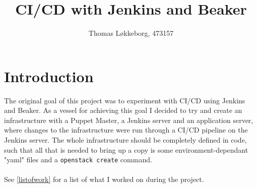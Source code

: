 

\title{CI/CD with Jenkins and Beaker}
\author{Thomas Løkkeborg, 473157}



\maketitle


\thispagestyle{empty}

\clearpage
{}
\setcounter{page}{1}
\tableofcontents

\clearpage
{}

\section{Introduction}

The original goal of this project was to experiment with CI/CD using Jenkins and Beaker. As a vessel for achieving this goal I decided to try and create an infrastructure with a Puppet Master, a Jenkins server and an application server, where changes to the infrastructure were run through a CI/CD pipeline on the Jenkins server. The whole infrastructure should be completely defined in code, such that all that is needed to bring up a copy is some environment-dependant "yaml" files and a \texttt{openstack create} command.
\\
\\
See \ref{listofwork} for a list of what I worked on during the project.

